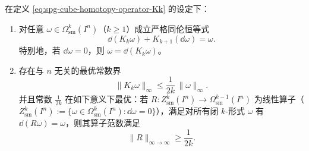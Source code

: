 \begin{theorem}\label{thm:spg-cube-optimal-bounded-poincare-stokes-inverse}
在定义 \eqref{eq:spg-cube-homotopy-operator-Kk} 的设定下：
\begin{enumerate}
  \item 对任意 \(\omega\in\Omega^k_{\mathrm{sm}}(I^n)\)（\(k\ge 1\)）成立严格同伦恒等式
  \begin{equation}\label{eq:spg-cube-homotopy-identity}
  \dd(K_k\omega)+K_{k+1}(\dd\omega)=\omega.
  \end{equation}
  特别地，若 \(\dd\omega=0\)，则 \(\omega=\dd(K_k\omega)\)。
  \item 存在与 \(n\) 无关的最优常数界
  \begin{equation}\label{eq:spg-cube-Kk-supnorm-bound}
  \|K_k\omega\|_\infty\le \frac{1}{2k}\,\|\omega\|_\infty.
  \end{equation}
  并且常数 \(\frac{1}{2k}\) 在如下意义下最优：若 \(R:Z^k_{\mathrm{sm}}(I^n)\to\Omega^{k-1}_{\mathrm{sm}}(I^n)\) 为线性算子（\(Z^k_{\mathrm{sm}}(I^n):=\{\omega\in\Omega^k_{\mathrm{sm}}(I^n):\dd\omega=0\}\)），满足对所有闭 \(k\)-形式 \(\omega\) 有 \(\dd(R\omega)=\omega\)，则其算子范数满足
  \begin{equation}\label{eq:spg-cube-optimal-lower-bound}
  \|R\|_{\infty\to\infty}\ge \frac{1}{2k}.
  \end{equation}
\end{enumerate}
\end{theorem}
